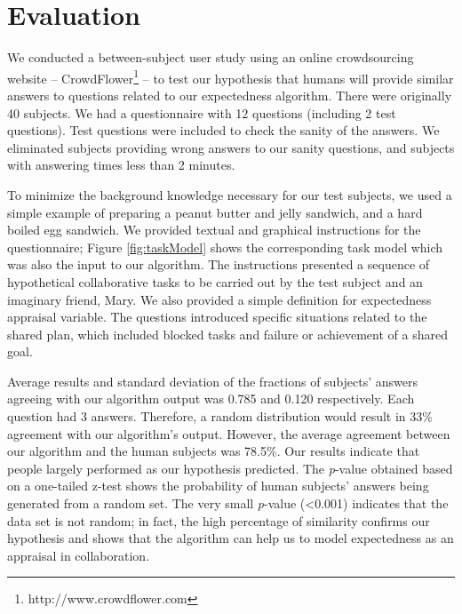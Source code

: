 \documentclass{aamas2016_extendedabstract}
\begin{document}
\vspace*{-6mm}
\section{Evaluation}

We conducted a between-subject user study using an online crowdsourcing website
-- CrowdFlower\footnote{http://www.crowdflower.com} -- to test our hypothesis
that humans will provide similar answers to questions related to our expectedness
algorithm. There were originally 40 subjects. We had a questionnaire with 12
questions (including 2 test questions). Test questions were included to check
the sanity of the answers. We eliminated subjects providing wrong answers to our
sanity questions, and subjects with answering times less than 2 minutes.

To minimize the background knowledge necessary for our test subjects, we used a
simple example of preparing a peanut butter and jelly sandwich, and a hard
boiled egg sandwich. We provided textual and graphical instructions for the
questionnaire; Figure \ref{fig:taskModel} shows the corresponding task
model which was also the input to our algorithm. The instructions presented a
sequence of hypothetical collaborative tasks to be carried out by the test
subject and an imaginary friend, Mary. We also provided a simple definition for
expectedness appraisal variable. The questions introduced specific situations
related to the shared plan, which included blocked tasks and failure or
achievement of a shared goal. 

% 

Average results and standard deviation of the fractions of subjects' answers
agreeing with our algorithm output was 0.785 and 0.120 respectively. Each
question had 3 answers. Therefore, a random distribution would result in 33\%
agreement with our algorithm's output. However, the average agreement between
our algorithm and the human subjects was 78.5\%. Our results indicate that
people largely performed as our hypothesis predicted. The \textit{p}-value
obtained based on a one-tailed z-test shows the probability of human subjects'
answers being generated from a random set. The very small \textit{p}-value
(<0.001) indicates that the data set is not random; in fact, the high percentage
of similarity confirms our hypothesis and shows that the algorithm can help us
to model expectedness as an appraisal in collaboration.
\end{document}
